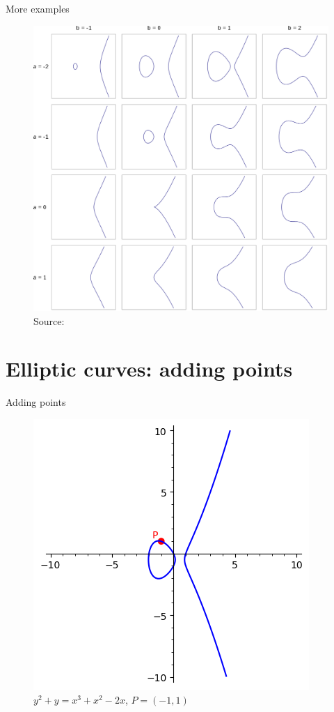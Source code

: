 \documentclass[aspectratio=169,xcolor=dvipsnames]{beamer}
\begin{document}
\begin{frame}{More examples}
    \begin{figure}
        \centering
        \includegraphics[height=0.7\textheight]{elliptic-curves.png}
        \caption{Source: \cite{wiki:elliptic:curve}}
    \end{figure}
\end{frame}


\section{Elliptic curves: adding points}

\begin{frame}{Adding points}
    \begin{figure}
        \centering
        \includegraphics[height=0.7\textheight]{adding-points-01.png}
        \caption{$y^2 + y = x^3 + x^2 - 2x$, $P=(-1,1)$}
    \end{figure}
\end{frame}
\end{document}

